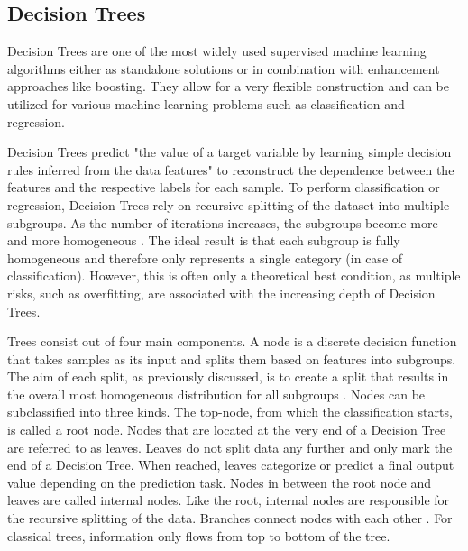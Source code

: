 \subsection{Decision Trees}
\label{sec:decision trees}

Decision Trees are one of the most widely used supervised machine learning algorithms either 
as standalone solutions or in combination with enhancement approaches like boosting. 
They allow for a very flexible construction and can be utilized for various machine learning problems
such as classification and regression.

Decision Trees predict "the value of a target variable by learning simple decision rules inferred 
from the data features" \cite{scikit-decision_tree} to reconstruct the dependence between the features and the respective labels for
each sample. To perform classification or regression, Decision Trees rely on recursive 
splitting of the dataset into multiple subgroups. As the number of iterations increases, the 
subgroups become more and more homogeneous \cite[p.330]{James2021}. The ideal result is that each subgroup is fully 
homogeneous and therefore only represents a single category (in case of classification). However, 
this is often only a theoretical best condition, as multiple risks, such as overfitting, are 
associated with the increasing depth of Decision Trees.

Trees consist out of four main components. A node is a discrete decision function that takes 
samples as its input and splits them based on features into subgroups. The aim of each split, 
as previously discussed, is to create a split that results in the overall most homogeneous 
distribution for all subgroups \cite[p.6]{lewis2000introduction}. Nodes can be subclassified into three kinds. The top-node, 
from which the classification starts, is called a root node. Nodes that are located at the 
very end of a Decision Tree are referred to as leaves. Leaves do not split data any further and 
only mark the end of a Decision Tree. When reached, leaves categorize or predict a final output 
value depending on the prediction task. Nodes in between the root node and leaves are called 
internal nodes. Like the root, internal nodes are responsible for the recursive splitting of 
the data. Branches connect nodes with each other \cite[p.4]{lewis2000introduction}. For classical trees, information only flows from 
top to bottom of the tree.

